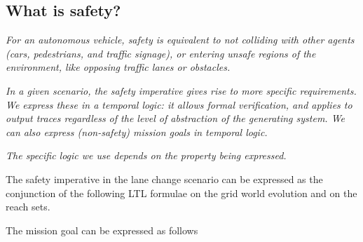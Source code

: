 \subsection{What is safety?}
\label{safety}

{\it For an autonomous vehicle, safety is equivalent to not colliding with other agents (cars, pedestrians, and traffic signage), or entering unsafe regions of the environment, like opposing traffic lanes or obstacles.}

{\it In a given scenario, the safety imperative gives rise to more specific requirements. 
	We express these in a temporal logic: it allows formal verification, and applies to output traces regardless of the level of abstraction of the generating system. We can also express (non-safety) mission goals in temporal logic.}

{\it The specific logic we use depends on the property being expressed.}

\begin{exmp}
	The safety imperative in the lane change scenario can be expressed as the conjunction of the following LTL formulae on the grid world evolution and on the reach sets.
	
	The mission goal can be expressed as follows
\end{exmp}

